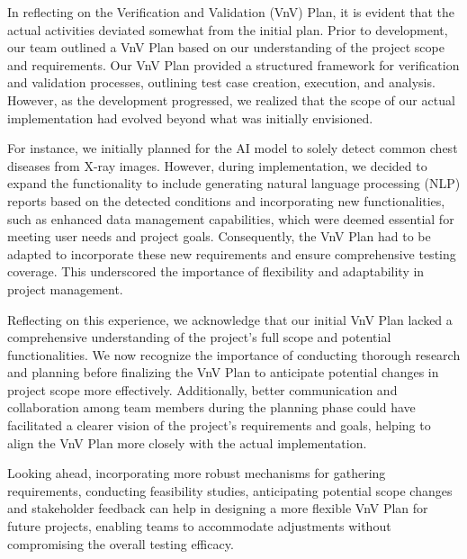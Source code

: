\documentclass[12pt, titlepage]{article}
\begin{document}
In reflecting on the Verification and Validation (VnV) Plan, it is evident that the actual activities deviated somewhat from the initial plan. Prior to development, our team outlined a VnV Plan based on our understanding of the project scope and requirements. Our VnV Plan provided a structured framework for verification and validation processes, outlining test case creation, execution, and analysis. However, as the development progressed, we realized that the scope of our actual implementation had evolved beyond what was initially envisioned.

For instance, we initially planned for the AI model to solely detect common chest diseases from X-ray images. However, during implementation, we decided to expand the functionality to include generating natural language processing (NLP) reports based on the detected conditions and incorporating new functionalities, such as enhanced data management capabilities, which were deemed essential for meeting user needs and project goals. Consequently, the VnV Plan had to be adapted to incorporate these new requirements and ensure comprehensive testing coverage. This underscored the importance of flexibility and adaptability in project management.

Reflecting on this experience, we acknowledge that our initial VnV Plan lacked a comprehensive understanding of the project's full scope and potential functionalities. We now recognize the importance of conducting thorough research and planning before finalizing the VnV Plan to anticipate potential changes in project scope more effectively. Additionally, better communication and collaboration among team members during the planning phase could have facilitated a clearer vision of the project's requirements and goals, helping to align the VnV Plan more closely with the actual implementation.

Looking ahead, incorporating more robust mechanisms for gathering requirements, conducting feasibility studies, anticipating potential scope changes and stakeholder feedback can help in designing a more flexible VnV Plan for future projects, enabling teams to accommodate adjustments without compromising the overall testing efficacy.
\end{document}
